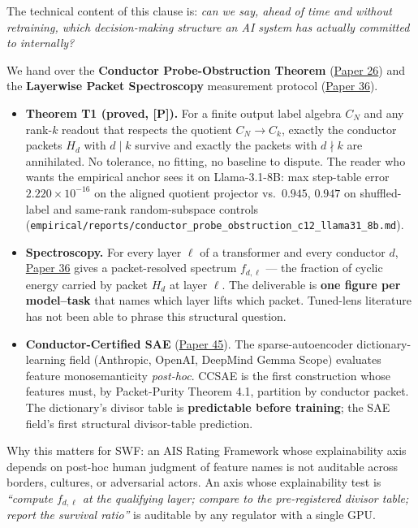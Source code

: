 \documentclass[
  letterpaper,
  11pt]{article}
\providecommand{\tightlist}{%
  \setlength{\itemsep}{0pt}\setlength{\parskip}{0pt}}
\theoremstyle{plain}
\theoremstyle{definition}
\theoremstyle{remark}
\begin{document}
The technical content of this clause is: \emph{can we say, ahead of time and without retraining, which decision-making structure an AI system has actually committed to internally?}

We hand over the \textbf{Conductor Probe-Obstruction Theorem} (\href{C:/Projects/simplicial/26.conductor_probe_obstruction_theorem.md}{Paper 26}) and the \textbf{Layerwise Packet Spectroscopy} measurement protocol (\href{C:/Projects/simplicial/36_layerwise_packet_spectroscopy.md}{Paper 36}).

\begin{itemize}
\tightlist
\item
  \textbf{Theorem T1 (proved, {[}P{]}).} For a finite output label algebra \(C_N\) and any rank-\(k\) readout that respects the quotient \(C_N \to C_k\), exactly the conductor packets \(H_d\) with \(d \mid k\) survive and exactly the packets with \(d \nmid k\) are annihilated. No tolerance, no fitting, no baseline to dispute. The reader who wants the empirical anchor sees it on Llama-3.1-8B: max step-table error \(2.220 \times 10^{-16}\) on the aligned quotient projector vs.~\(0.945\), \(0.947\) on shuffled-label and same-rank random-subspace controls (\texttt{empirical/reports/conductor\_probe\_obstruction\_c12\_llama31\_8b.md}).
\item
  \textbf{Spectroscopy.} For every layer \(\ell\) of a transformer and every conductor \(d\), \href{C:/Projects/simplicial/36_layerwise_packet_spectroscopy.md}{Paper 36} gives a packet-resolved spectrum \(f_{d,\ell}\) --- the fraction of cyclic energy carried by packet \(H_d\) at layer \(\ell\). The deliverable is \textbf{one figure per model--task} that names which layer lifts which packet. Tuned-lens literature has not been able to phrase this structural question.
\item
  \textbf{Conductor-Certified SAE} (\href{C:/Projects/simplicial/45_conductor_certified_sparse_autoencoders.md}{Paper 45}). The sparse-autoencoder dictionary-learning field (Anthropic, OpenAI, DeepMind Gemma Scope) evaluates feature monosemanticity \emph{post-hoc}. CCSAE is the first construction whose features must, by Packet-Purity Theorem 4.1, partition by conductor packet. The dictionary's divisor table is \textbf{predictable before training}; the SAE field's first structural divisor-table prediction.
\end{itemize}

Why this matters for SWF: an AIS Rating Framework whose explainability axis depends on post-hoc human judgment of feature names is not auditable across borders, cultures, or adversarial actors. An axis whose explainability test is \emph{``compute \(f_{d,\ell}\) at the qualifying layer; compare to the pre-registered divisor table; report the survival ratio''} is auditable by any regulator with a single GPU.
\end{document}
